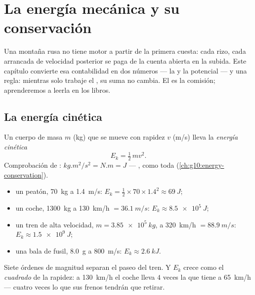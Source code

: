 \chapter{La energía mecánica y su conservación}\label{ch:g11:mechanical-energy}

Una montaña rusa no tiene motor a partir de la primera cuesta: cada
rizo, cada arrancada de velocidad posterior se paga de la cuenta abierta
en la subida. Este capítulo convierte esa contabilidad en dos números
--- la  y la potencial --- y una regla: mientras solo
trabaje el , su suma no cambia. El  es la comisión;
aprenderemos a leerla en los libros.

\section{La energía cinética}

\begin{definition}\label{def:g11:mechanical-energy:kinetic}
Un cuerpo de masa $m$ (\unit{kg}) que se mueve con rapidez $v$
(\unit{m/s}) lleva la \emph{energía cinética}
\[
E_k = \tfrac12\, m v^2 .
\]
Comprobación de : $\unit{kg.m^2/s^2} = \unit{N.m} = \unit{J}$
--- , como toda  (\cref{ch:g10:energy-conservation}).
\end{definition}

\begin{example}\label{ex:g11:mechanical-energy:orders}
\begin{itemize}
  \item un peatón, \qty{70}{kg} a \qty{1.4}{m/s}:
        $E_k = \tfrac12 \times 70 \times 1.4^2 \approx \qty{69}{J}$;
  \item un coche, \qty{1300}{kg} a \qty{130}{km/h} $= \qty{36.1}{m/s}$:
        $E_k \approx \qty{8.5e5}{J}$;
  \item un tren de alta velocidad, $m = \qty{3.85e5}{kg}$, a
        \qty{320}{km/h} $= \qty{88.9}{m/s}$: $E_k \approx \qty{1.5e9}{J}$;
  \item una bala de fusil, \qty{8.0}{g} a \qty{800}{m/s}:
        $E_k \approx \qty{2.6}{kJ}$.
\end{itemize}
Siete órdenes de magnitud separan el paseo del tren. Y $E_k$ crece como
el \emph{cuadrado} de la rapidez: a \qty{130}{km/h} el coche lleva $4$
veces la  que tiene a \qty{65}{km/h} --- cuatro veces lo que sus
frenos tendrán que retirar.
\end{example}

